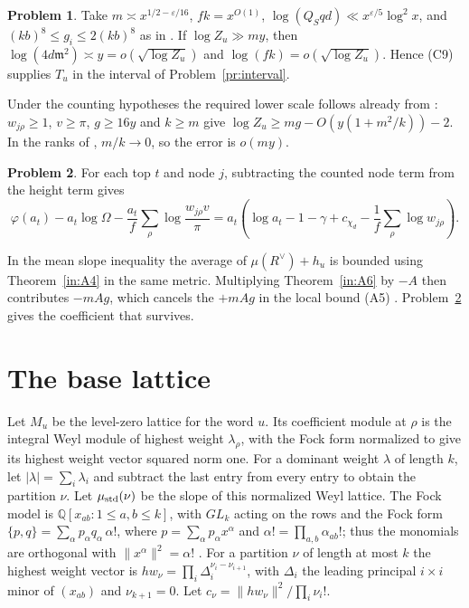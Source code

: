 \documentclass[reqno]{amsart}
\theoremstyle{definition}
\newtheorem{problem}{Problem}[section]
\theoremstyle{plain}
\newcommand{\Q}{\mathbb{Q}}
\begin{document}
\begin{problem}\label{pr:ray}
Take $m\asymp x^{1/2-\varepsilon/16}$, $fk=x^{O(1)}$,
$\log(Q_Sqd)\ll x^{\varepsilon/5}\log^2 x$, and
$(kb)^8\le g_i\le2(kb)^8$ as in \cite[Prop.~5.15, Def.~6.1]{Adr}.
If $\log Z_u\gg my$, then $\log(4d\mathfrak m^2)\asymp y=o(\sqrt{\log Z_u})$
and $\log(fk)=o(\sqrt{\log Z_u})$.  Hence (C9) supplies $T_u$ in
the interval of Problem~\ref{pr:interval}.
\end{problem}

Under the counting hypotheses the required lower scale follows already
from \cite[Prop.~15.25]{Adr}: $w_{j\rho}\ge1$, $v\ge\pi$,
$g\ge16y$ and $k\ge m$ give
$\log Z_u\ge mg-O(y(1+m^2/k))-2$.  In the ranks of
\cite[Prop.~5.15]{Adr}, $m/k\to0$, so the error is $o(my)$.

\begin{problem}\label{pr:linear}
For each top $t$ and node $j$, subtracting the counted node term from
the height term gives
\[
 \varphi(a_t)-a_t\log\Omega-
 \frac{a_t}{f}\sum_\rho\log\frac{w_{j\rho}v}{\pi}
 =a_t\left(\log a_t-1-\gamma+c_{\chi_d}
               -\frac1f\sum_\rho\log w_{j\rho}\right).
\]
\end{problem}

In the mean slope inequality the average of $\mu(R^\vee)+h_u$ is
bounded using Theorem~\ref{in:A4} in the same metric.  Multiplying
Theorem~\ref{in:A6} by $-A$ then contributes $-mAg$, which cancels the
$+mAg$ in the local bound (A5) \cite[Prop.~3.1]{Adr}.
Problem~\ref{pr:linear} gives the coefficient that survives.

\section{The base lattice}\label{sec:base}

Let $M_u$ be the level-zero lattice for the word $u$.  Its coefficient
module at $\rho$ is the integral Weyl module of highest weight
$\lambda_\rho$, with the Fock form normalized to give its highest
weight vector squared norm one.  For a dominant weight $\lambda$ of
length $k$, let $|\lambda|=\sum_i\lambda_i$ and subtract the last
entry from every entry to obtain the partition $\nu$.
Let $\mu_{\rm std}(\nu)$ be the slope of this normalized Weyl lattice.
The Fock model is $\Q[x_{ab}:1\le a,b\le k]$, with $GL_k$ acting on the rows
and the Fock form $\{p,q\}=\sum_\alpha p_\alpha q_\alpha\,\alpha!$, where
$p=\sum_\alpha p_\alpha x^\alpha$ and $\alpha!=\prod_{a,b}\alpha_{ab}!$; thus the
monomials are orthogonal with $\|x^\alpha\|^2=\alpha!$ \cite[\S15.7]{Adr}.
For a partition $\nu$ of length at most $k$ the highest weight vector is
$hw_\nu=\prod_i\Delta_i^{\nu_i-\nu_{i+1}}$, with $\Delta_i$ the leading
principal $i\times i$ minor of $(x_{ab})$ and $\nu_{k+1}=0$.
Let $c_\nu=\|hw_\nu\|^2/\prod_i\nu_i!$.
\end{document}
